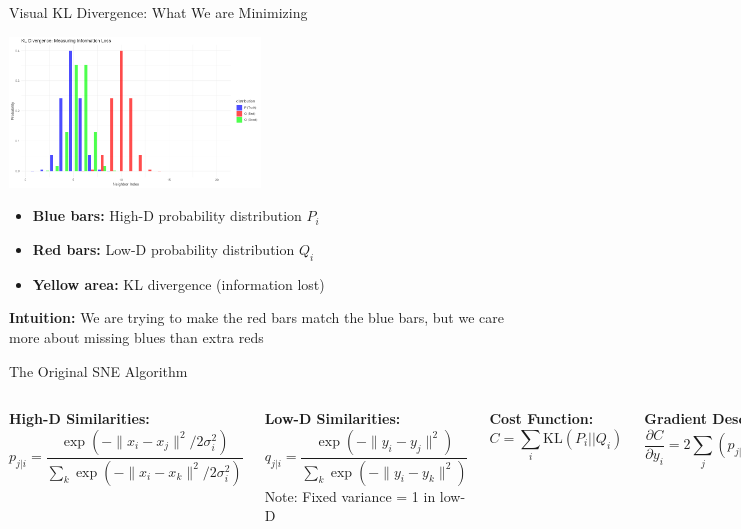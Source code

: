 \documentclass[aspectratio=169]{beamer}
\newcommand{\intuition}[1]{\colorbox{green!10}{\textcolor{intuitioncolor}{\textbf{Intuition:} #1}}}
\begin{document}
\begin{frame}{Visual KL Divergence: What We are Minimizing}
\begin{center}
\includegraphics[width=0.5\textwidth]{./Figures/kl_divergence_visualization.png}
\end{center}
\begin{itemize}
\item \textbf{Blue bars:} High-D probability distribution $P_i$
\item \textbf{Red bars:} Low-D probability distribution $Q_i$
\item \textbf{Yellow area:} KL divergence (information lost)
\end{itemize}
\intuition{We are trying to make the red bars match the blue bars, but we care more about missing blues than extra reds}
\end{frame}


  \begin{frame}{The Original SNE Algorithm}
  \begin{columns}
  \textbf{High-D Similarities:}
  $$p_{j|i} = \frac{\exp(-\|x_i-x_j\|^2/2\sigma_i^2)}{\sum_k \exp(-\|x_i-x_k\|^2/2\sigma_i^2)}$$
    
    \textbf{Low-D Similarities:}
  $$q_{j|i} = \frac{\exp(-\|y_i-y_j\|^2)}{\sum_k \exp(-\|y_i-y_k\|^2)}$$
    Note: Fixed variance = 1 in low-D
    
    \textbf{Cost Function:}
    $$C = \sum_i \text{KL}(P_i||Q_i)$$
      
      \textbf{Gradient Descent:}
    $$\frac{\partial C}{\partial y_i} = 2\sum_j (p_{j|i} - q_{j|i})(y_i - y_j)$$
      
      \includegraphics[width=0.5\textwidth]{./Figures/sne_gradient_forces.png}
    \end{columns}
\end{frame}
    
\end{document}

